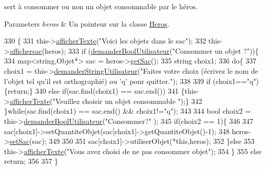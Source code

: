 sert à consommer ou non un objet consommable par le héros. 


\begin{DoxyParams}{Parameters}
{\em heros} & Un pointeur sur la classe \hyperlink{class_heros}{Heros}. \\
\hline
\end{DoxyParams}

\begin{DoxyCode}
330                                   \{
331         this->\hyperlink{class_jeu_aa09fb40439f16b9665a0d76679f78e4e}{afficherTexte}(\textcolor{stringliteral}{"Voici les objets dans le sac"});
332         this->\hyperlink{class_jeu_ac70f7bfb1945030e04287da3a35973af}{affichersac}(heros);
333         \textcolor{keywordflow}{if} (\hyperlink{class_jeu_a3aa07b1e7a5e5d82479b8bb2a2841635}{demanderBoolUtilisateur}(\textcolor{stringliteral}{"Consommer un objet ?"}))\{
334         map<string,Objet*> sac = heros->\hyperlink{class_heros_a62d8b172e82dbb0a1d2c23da21bdb069}{getSac}();
335         \textcolor{keywordtype}{string} choix1;
336         \textcolor{keywordflow}{do}\{
337          choix1 = this->\hyperlink{class_jeu_a4b70e906117c6a21b989ad3ab672c83c}{demanderStringUtilisateur}(\textcolor{stringliteral}{"Faites votre choix (écrivez le
       nom de l'objet tel qu'il est orthographié) ou 'q' pour quitter."});
338 
339          \textcolor{keywordflow}{if} (choix1==\textcolor{stringliteral}{"q"}) \{\textcolor{keywordflow}{return};\}
340          \textcolor{keywordflow}{else} \textcolor{keywordflow}{if}(sac.find(choix1) == sac.end())
341                                    \{this->\hyperlink{class_jeu_aa09fb40439f16b9665a0d76679f78e4e}{afficherTexte}(\textcolor{stringliteral}{"Veuillez choisir un objet consommable
      "});\}
342         \}\textcolor{keywordflow}{while}(sac.find(choix1) == sac.end() && choix1!=\textcolor{stringliteral}{"q"});
343 
344          \textcolor{keywordtype}{bool} choix2 = this->\hyperlink{class_jeu_a3aa07b1e7a5e5d82479b8bb2a2841635}{demanderBoolUtilisateur}(\textcolor{stringliteral}{"Consommer?"} );
345                  \textcolor{keywordflow}{if}(choix2 == 1)\{
346 
347                          sac[choix1]->setQuantiteObjet(sac[choix1]->getQuantiteObjet()-1);
348                          heros->\hyperlink{class_heros_a7d6d86388fe81deca1c5688ed07b2167}{setSac}(sac);
349 
350 
351                          sac[choix1]->utiliserObjet(*\textcolor{keyword}{this},heros);
352                  \}\textcolor{keywordflow}{else}
353                          this->\hyperlink{class_jeu_aa09fb40439f16b9665a0d76679f78e4e}{afficherTexte}(\textcolor{stringliteral}{"Vous avez choisi de ne pas consommer objet"});
354         \}
355         \textcolor{keywordflow}{else} \textcolor{keywordflow}{return};
356 
357 \}
\end{DoxyCode}
